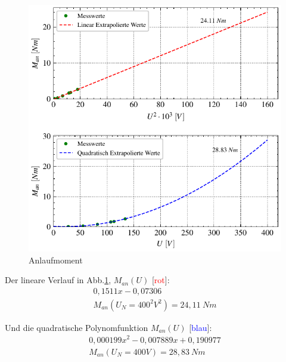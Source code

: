 \documentclass[conference]{IEEEtran}
\begin{document}
\begin{figure}[htbp]
    \centering
    \includegraphics[width=\columnwidth]{./figures/anlaufmoment.pdf}
    \caption{Anlaufmoment}
    \label{fig:Anlaufmoment}
\end{figure}

Der lineare Verlauf in Abb.\ref{fig:Anlaufmoment}, $M_{an}(U)$ [\textcolor{red}{rot}]:
\begin{gather*}
    0,1511 x - 0,07306 \\
    M_{an}(U_N=400^2V^2)=24,11\ \si{Nm}
\end{gather*}

Und die quadratische Polynomfunktion $M_{an}(U)$ [\textcolor{blue}{blau}]:
\begin{gather*}
    0,000199 x^2 -0,007889 x + 0,190977\\
    M_{an}(U_N=400V)=28,83\ \si{Nm}
\end{gather*}


\end{document}
